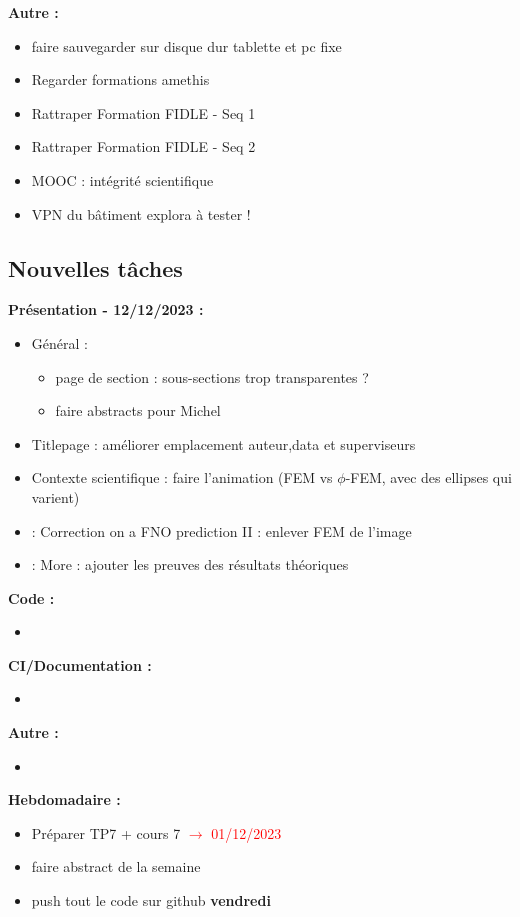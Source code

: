 \textbf{Autre :}
\begin{itemize}[label=$\square$] 
	\item[\previous{4}] faire sauvegarder sur disque dur tablette et pc fixe
	\item[\previous{6}] Regarder formations amethis
	\item[\previous{7}] Rattraper Formation FIDLE - Seq 1
	\item[\previous{8}] Rattraper Formation FIDLE - Seq 2
	\item[\previous{8}] MOOC : intégrité scientifique
	\item[\previous{8}] VPN du bâtiment explora à tester !
\end{itemize}

\newpage

\subsection*{Nouvelles tâches}

\textbf{Présentation - 12/12/2023 :}
\begin{itemize}[label=$\square$] 
	\item Général :
	\begin{itemize}[label=\LARGE $\circ$]
		\item page de section : sous-sections trop transparentes ?
		\item faire abstracts pour Michel 
	\end{itemize}
	\item Titlepage : améliorer emplacement auteur,data et superviseurs
	\item Contexte scientifique : faire l'animation (FEM vs $\phi$-FEM, avec des ellipses qui varient)
	\item : Correction on a FNO prediction II : enlever FEM de l'image
	\item : More : ajouter les preuves des résultats théoriques
\end{itemize}
\textbf{Code :}
\begin{itemize}[label=$\square$] 
	\item
\end{itemize}
\textbf{CI/Documentation :}
\begin{itemize}[label=$\square$] 
	\item 
\end{itemize}
\textbf{Autre :}
\begin{itemize}[label=$\square$] 
	\item
\end{itemize}
\textbf{Hebdomadaire :}
\begin{itemize}[label=$\square$] 
	\item[\done] Préparer TP7 + cours 7 \textcolor{red}{$\rightarrow$ 01/12/2023}
	\item faire abstract de la semaine 
	\item push tout le code sur github \textbf{vendredi}
\end{itemize}